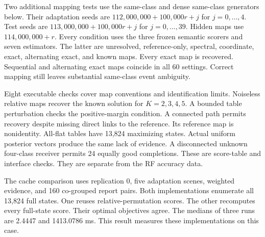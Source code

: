 \begin{table}[!htb]\caption{Map recovery across adaptation budgets. Counts cover 120 withheld entries over ten interventions. Exact F1 averages 80 test-scene scores within each replication. The full saved summary includes all eight estimators, their objective gaps, and replication-level intervals.}\label{tab:deep_budget}
\small\setlength{\tabcolsep}{3pt}\end{table}

Two additional mapping tests use the same-class and dense same-class generators below. Their adaptation seeds are $112{,}000{,}000+100{,}000r+j$ for $j=0,\ldots,4$. Test seeds are $113{,}000{,}000+100{,}000r+j$ for $j=0,\ldots,39$. Hidden maps use $114{,}000{,}000+r$. Every condition uses the three frozen semantic scorers and seven estimators. The latter are unresolved, reference-only, spectral, coordinate, exact, alternating exact, and known maps. Every exact map is recovered. Sequential and alternating exact maps coincide in all 60 settings. Correct mapping still leaves substantial same-class event ambiguity.

\begin{table}[!htb]\caption{Unknown maps under same-class collisions. Each row uses five adaptation scenes and 400 test scenes across ten replications. Map counts sum hidden entries. Physical descriptors, scorer parameters, and initial physical-only groups stay fixed across estimators. Exact and known-map results coincide.}\label{tab:deep_map_stress}
\scriptsize\setlength{\tabcolsep}{2.5pt}\end{table}

Eight executable checks cover map conventions and identification limits. Noiseless relative maps recover the known solution for $K=2,3,4,5$. A bounded table perturbation checks the positive-margin condition. A connected path permits recovery despite missing direct links to the reference. Its reference map is nonidentity. All-flat tables have 13,824 maximizing states. Actual uniform posterior vectors produce the same lack of evidence. A disconnected unknown four-class receiver permits 24 equally good completions. These are score-table and interface checks. They are separate from the RF accuracy data.

The cache comparison uses replication 0, five adaptation scenes, weighted evidence, and 160 co-grouped report pairs. Both implementations enumerate all 13,824 full states. One reuses relative-permutation scores. The other recomputes every full-state score. Their optimal objectives agree. The medians of three runs are 2.4447 and 1413.0786 ms. This result measures these implementations on this case.

